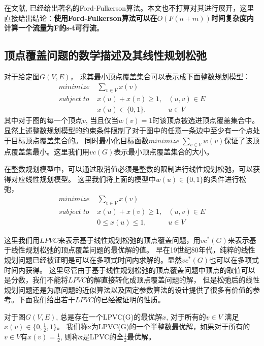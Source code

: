 在文献\cite{ford1962flows}, 已经给出著名的Ford-Fulkerson算法。本文也不打算对其进行展开，这里直接给出结论：\textbf{使用Ford-Fulkerson算法可以在$O(F(n + m))$时间复杂度内计算一个流量为F的s-t可行流}。

\subsection{顶点覆盖问题的数学描述及其线性规划松弛}
对于给定图$G(V, E)$， 求其最小顶点覆盖集合可以表示成下面整数规划模型：
\begin{equation} \label{ModelLPVC1} \begin{aligned}
  minimize\; & \sum_{v \in V}{x(v)} &\\
  subject\; to\; & x(u) + x(v) \ge 1, &(u, v) \in E \\
   & x(u) \in \{0, 1\}, & u \in V
\end{aligned} \end{equation}
其中对于图的每一个顶点$v$, 当且仅当$w(v) = 1$时该顶点被选进顶点覆盖集合中。
显然上述整数规划模型的约束条件限制了对于图中的任意一条边中至少有一个点处于目标顶点覆盖集合的。
同时最小化目标函数$minimize\; \sum_{v \in V}{w(v)}$保证了该顶点覆盖集最小。这里我们用$vc(G)$表示最小顶点覆盖集合的大小。

在整数规划模型中，可以通过取消值必须是整数的限制进行线性规划松弛，可以获得对应线性规划模型。
这里我们将上面的模型中$w(u) \in \{0, 1\}$的条件进行松弛，
\begin{equation} \begin{aligned}
  minimize\; & \sum_{v \in V}{x(v)} &\\
  subject\; to\; & x(u) + x(v) \ge 1, &(u, v) \in E \\
   & 0 \le x(u) \le 1, & u \in V
\end{aligned} \end{equation}

这里我们用$LPVC$来表示基于线性规划松弛的顶点覆盖问题，用$vc^{*}(G)$来表示基于线性规划松弛的顶点覆盖问题的最优解的值。
早在19世纪80年代，纯粹的线性规划问题已经被证明是可以在多项式时间内求解的\cite{khachiian1979polynomial}。显然$vc^{*}(G)$也可以在多项式时间内获得。
这里尽管由于基于线性规划松弛的顶点覆盖问题中顶点的取值可以是分数，我们不能将$LPVC$的解直接转化成顶点覆盖问题的解，
但是松弛后的线性规划问题还是为原问题的近似算法以及固定参数算法的设计提供了很多有价值的参考。下面我们给出若干$LPVC$的已经被证明的性质。
\begin{lemma}
对于图$G(V, E)$, 总是存在一个LPVC(G)的最优解$x$, 对于所有的$v \in V$ 满足$x(v) \in \{0, \frac{1}{2}, 1\}$。
我们称x为LPVC(G)的一个半整数最优解，如果对于所有的$v \in V$有$x(v) = \frac{1}{2}$, 则称x是LPVC的全$\frac{1}{2}$最优解。
\end{lemma}

